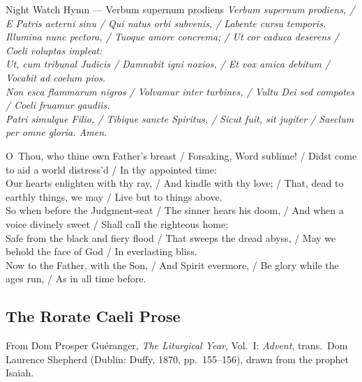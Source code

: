 \begin{massbox}{Night Watch Hymn --- Verbum supernum prodiens}
\textit{Verbum supernum prodiens, / E Patris aeterni sinu / Qui natus orbi subvenis, / Labente cursu temporis.}\\
\textit{Illumina nunc pectora, / Tuoque amore concrema; / Ut cor caduca deserens / Coeli voluptas impleat:}\\
\textit{Ut, cum tribunal Judicis / Damnabit igni noxios, / Et vox amica debitum / Vocabit ad coelum pios.}\\
\textit{Non esca flammarum nigros / Volvamur inter turbines, / Vultu Dei sed compotes / Coeli fruamur gaudiis.}\\
\textit{Patri simulque Filio, / Tibique sancte Spiritus, / Sicut fuit, sit jugiter / Saeclum per omne gloria. Amen.}

\medskip
O~Thou, who thine own Father's breast / Forsaking, Word sublime! / Didst come to aid a world distress'd / In thy appointed time:\\
Our hearts enlighten with thy ray, / And kindle with thy love; / That, dead to earthly things, we may / Live but to things above.\\
So when before the Judgment-seat / The sinner hears his doom, / And when a voice divinely sweet / Shall call the righteous home;\\
Safe from the black and fiery flood / That sweeps the dread abyss, / May we behold the face of God / In everlasting bliss.\\
Now to the Father, with the Son, / And Spirit evermore, / Be glory while the ages run, / As in all time before.
\end{massbox}

\subsection{The Rorate Caeli Prose}

From Dom Prosper Gu\'eranger, \textit{The Liturgical Year}, Vol.~I: \textit{Advent}, trans.~Dom Laurence Shepherd (Dublin: Duffy, 1870, pp.~155--156), drawn from the prophet Isaiah.

